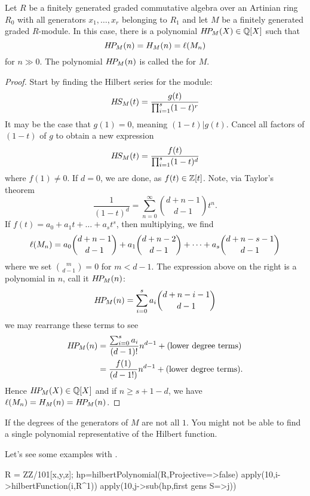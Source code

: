 \documentclass{ximera}
\begin{document}
\begin{corollary}\label{C:hp}
  Let $R$ be a finitely generated graded commutative algebra over an
  Artinian ring $R_0$ with all generators $x_1,\dots,x_r$ belonging to
  $R_1$ and let $M$ be a finitely generated graded $R$-module. In this
  case, there is a polynomial $H\!P_M(X)\in\mathbb Q[X]$ such that
  \[
  H\!P_M(n) = H_M(n) = \ell(M_n)
  \]
  for $n\gg 0$. The polynomial $H\!P_M(n)$ is called the
   for $M$.
  \begin{proof}
    Start by finding the Hilbert series for the module:
    \[
    H\!S_M(t) = \frac{g(t)}{\prod_{i=1}^s(1-t)^r}
    \]
    It may be the case that $g(1) = 0$, meaning $(1-t)|g(t)$. Cancel
    all factors of $(1-t)$ of $g$ to obtain a new expression
    \[
    H\!S_M(t) = \frac{f(t)}{\prod_{i=1}^s(1-t)^d}
    \]
    where $f(1) \ne 0$. If $d=0$, we are done, as $f(t)\in
    \mathbb Z[t]$. Note, via Taylor's theorem
    \[
    \frac{1}{(1-t)^d} = \sum_{n=0}^\infty \binom{d+n-1}{d-1}t^n.
    \]
    If $f(t) = a_0 + a_1 t + \dots + a_s t^s$, then multiplying, we find
    \[
    \ell(M_n) = a_0 \binom{d+n-1}{d-1} + a_1 \binom{d+n-2}{d-1} + \dots + a_s \binom{d+n-s-1}{d-1}
    \]
    where we set $\binom{m}{d-1} = 0$ for $m<d-1$. The expression
    above on the right is a polynomial in $n$, call it $H\!P_M(n)$:
    \[
    H\!P_M(n) = \sum_{i=0}^s a_i \binom{d+n-i-1}{d-1}
    \]
    we may rearrange these terms to see
    \begin{align*}
    H\!P_M(n) &= \frac{\sum_{i=0}^s a_i}{(d-1)!}n^{d-1} + (\text{lower degree terms})\\
    &= \frac{f(1)}{(d-1!)}n^{d-1}  + (\text{lower degree terms}).
    \end{align*}
    Hence $H\!P_M(X)\in \mathbb Q[X]$ and if $n\ge s+1-d$, we have $\ell(M_n) =
    H_M(n) = H\!P_M(n)$.
    \end{proof}
\end{corollary}

\begin{remark}
   If the degrees of the generators of $M$ are not all $1$. You might
   not be able to find a single polynomial representative of the
   Hilbert function.
\end{remark}

Let's see some examples with \macaulay.

\begin{macaulay2}
R = ZZ/101[x,y,z];
hp=hilbertPolynomial(R,Projective=>false)
apply(10,i->hilbertFunction(i,R^1))
apply(10,j->sub(hp,{first gens S=>j}))
\end{macaulay2}
\end{document}
